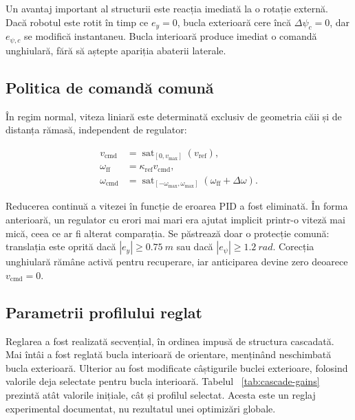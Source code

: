 \documentclass[12pt,a4paper,oneside]{report}
\newcommand{\sat}{\operatorname{sat}}
\begin{document}
Un avantaj important al structurii este reacția imediată la o rotație externă.
Dacă robotul este rotit în timp ce $e_y=0$, bucla exterioară cere încă
$\Delta\psi_c=0$, dar $e_{\psi,c}$ se modifică instantaneu. Bucla interioară
produce imediat o comandă unghiulară, fără să aștepte apariția abaterii laterale.

\subsection{Politica de comandă comună}

În regim normal, viteza liniară este determinată exclusiv de geometria căii și
de distanța rămasă, independent de regulator:

\begin{align}
  v_{\mathrm{cmd}} &= \sat_{[0,v_{\max}]}(v_{\mathrm{ref}}), \\
  \omega_{\mathrm{ff}} &= \kappa_{\mathrm{ref}}v_{\mathrm{cmd}}, \\
  \omega_{\mathrm{cmd}} &=
  \sat_{[-\omega_{\max},\omega_{\max}]}
  (\omega_{\mathrm{ff}}+\Delta\omega).
\end{align}

Reducerea continuă a vitezei în funcție de eroarea PID a fost eliminată. În
forma anterioară, un regulator cu erori mai mari era ajutat implicit printr-o
viteză mai mică, ceea ce ar fi alterat comparația. Se păstrează doar o protecție
comună: translația este oprită dacă $|e_y|\geq\SI{0.75}{m}$ sau dacă
$|e_\psi|\geq\SI{1.2}{rad}$. Corecția unghiulară rămâne activă pentru
recuperare, iar anticiparea devine zero deoarece $v_{\mathrm{cmd}}=0$.

\subsection{Parametrii profilului reglat}

Reglarea a fost realizată secvențial, în ordinea impusă de structura cascadată.
Mai întâi a fost reglată bucla interioară de orientare, menținând neschimbată
bucla exterioară. Ulterior au fost modificate câștigurile buclei exterioare,
folosind valorile deja selectate pentru bucla interioară. Tabelul
~\ref{tab:cascade-gains} prezintă atât valorile inițiale, cât și profilul
selectat. Acesta este un reglaj experimental documentat, nu rezultatul unei
optimizări globale.
\end{document}
